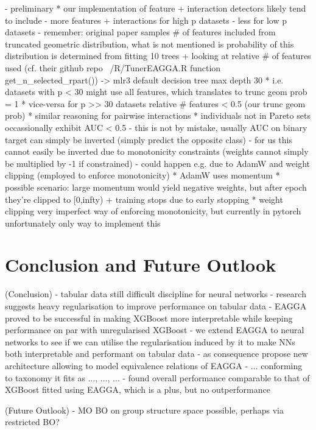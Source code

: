 \documentclass[twoside,11pt]{article}
\begin{document}
    - preliminary
  * our implementation of feature + interaction detectors likely tend to include  %
    - more features + interactions for high p datasets
    - less for low p datasets
    - remember: original paper samples \# of features included from truncated geometric distribution, what is not mentioned is probability of this distribution
      is determined from fitting 10 trees + looking at relative \# of features used (cf. their github repo ~/R/TunerEAGGA.R function get\_n\_selected\_rpart())
    -> mlr3 default decision tree max depth 30
      * i.e. datasets with p < 30 might use all features, which translates to trunc geom prob = 1
      * vice-versa for p >> 30 datasets relative \# features < 0.5 (our trunc geom prob)
      * similar reasoning for pairwise interactions
  * individuals not in Pareto sets occassionally exhibit AUC < 0.5
    - this is not by mistake, usually AUC on binary target can simply be inverted (simply predict the opposite class)
    - for us this cannot easily be inverted due to monotonicity constraints (weights cannot simply be multiplied by -1 if constrained)
    - could happen e.g. due to AdamW and weight clipping (employed to enforce monotonicity)
      * AdamW uses momentum
      * possible scenario: large momentum would yield negative weights, but after epoch they're clipped to [0,infty) + training stops due to early stopping
      * weight clipping very imperfect way of enforcing monotonicity, but currently in pytorch unfortunately only way to implement this


\section{Conclusion and Future Outlook}
(Conclusion)
- tabular data still difficult discipline for neural networks
- research suggests heavy regularisation to improve performance on tabular data
- EAGGA proved to be successful in making XGBoost more interpretable while keeping performance on par with unregularised XGBoost
- we extend EAGGA to neural networks to see if we can utilise the regularisation induced by it to make NNs both interpretable and performant on tabular data
- as consequence propose new architecture allowing to model equivalence relations of EAGGA
- ... conforming to \citet[chap. 2]{survey_NN_interpretability} taxonomy it fits as ..., ..., ... %
- found overall performance comparable to that of XGBoost fitted using EAGGA, which is a plus, but no outperformance

(Future Outlook)
- MO BO on group structure space possible, perhaps via restricted BO?
\end{document}
